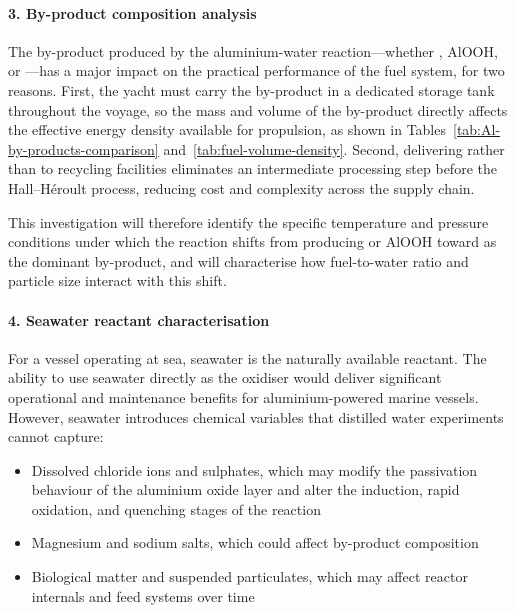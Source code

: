 \documentclass[12pt]{article}
\begin{document}
\paragraph{3. By-product composition analysis}

The by-product produced by the aluminium-water reaction---whether , 
AlOOH, or ---has a major impact on the practical performance of the fuel 
system, for two reasons. First, the yacht must carry the by-product in a dedicated 
storage tank throughout the voyage, so the mass and volume of the by-product directly 
affects the effective energy density available for propulsion, as shown in 
Tables~\ref{tab:Al-by-products-comparison} and~\ref{tab:fuel-volume-density}. Second, delivering 
 rather than  to recycling facilities eliminates an 
intermediate processing step before the Hall--H\'{e}roult process, reducing cost 
and complexity across the supply chain.

This investigation will therefore identify the specific temperature and pressure 
conditions under which the reaction shifts from producing  or AlOOH 
toward  as the dominant by-product, and will characterise how 
fuel-to-water ratio and particle size interact with this shift.

\paragraph{4. Seawater reactant characterisation}

For a vessel operating at sea, seawater is the naturally available reactant. The 
ability to use seawater directly as the oxidiser would deliver significant operational 
and maintenance benefits for aluminium-powered marine vessels. However, seawater 
introduces chemical variables that distilled water experiments cannot capture:

\begin{itemize}
    \item Dissolved chloride ions and sulphates, which may modify the passivation 
    behaviour of the aluminium oxide layer and alter the induction, rapid oxidation, 
    and quenching stages of the reaction
    \item Magnesium and sodium salts, which could affect by-product composition
    \item Biological matter and suspended particulates, which may affect reactor 
    internals and feed systems over time
\end{itemize}
\end{document}
